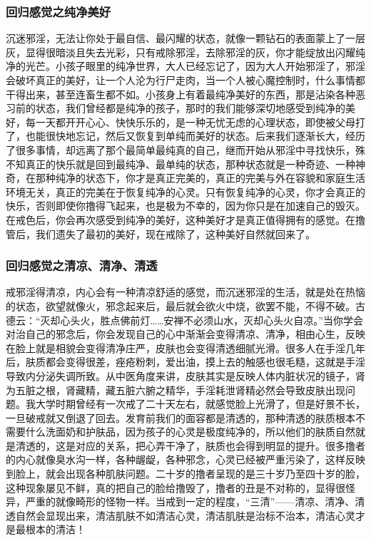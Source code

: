 \subsubsection{回归感觉之纯净美好}

沉迷邪淫，无法让你处于最自信、最闪耀的状态，就像一颗钻石的表面蒙上了一层灰，显得很暗淡且失去光彩，只有戒除邪淫，去除邪淫的灰，你才能绽放出闪耀纯净的光芒。小孩子眼里的纯净世界，大人已经忘记了，因为大人开始邪淫了，邪淫会破坏真正的美好，让一个人沦为行尸走肉，当一个人被心魔控制时，什么事情都干得出来，甚至连畜生都不如。小孩身上有着最纯净美好的东西，那是沾染各种恶习前的状态，我们曾经都是纯净的孩子，那时的我们能够深切地感受到纯净的美好，每一天都开开心心、快快乐乐的，是一种无忧无虑的心理状态，即使被父母打了，也能很快地忘记，然后又恢复到单纯而美好的状态。后来我们逐渐长大，经历了很多事情，却远离了那个最简单最纯真的自己，继而开始从邪淫中寻找快乐，殊不知真正的快乐就是回到最纯净、最单纯的状态，那种状态就是一种奇迹、一种神奇，在那种纯净的状态下，你才是真正完美的，真正的完美与外在容貌和家庭生活环境无关，真正的完美在于恢复纯净的心灵。只有恢复纯净的心灵，你才会真正的快乐，否则即使你撸得飞起来，也是极为不幸的，因为你只是在加速自己的毁灭。在戒色后，你会再次感受到纯净的美好，这种美好才是真正值得拥有的感觉。在撸管后，我们遗失了最初的美好，现在戒除了，这种美好自然就回来了。

\subsubsection{回归感觉之清凉、清净、清透}

戒邪淫得清凉，内心会有一种清凉舒适的感觉，而沉迷邪淫的生活，就是处在热恼的状态，欲望就像火，邪念起来后，最后就会欲火中烧，欲罢不能，不得不破。古德云：“灭却心头火，胜点佛前灯……安禅不必须山水，灭却心头火自凉。”当你学会对治自己的邪念后，你会发现自己的心中渐渐会变得清凉、清净，相由心生，反映在脸上就是相貌会变得清净庄严，皮肤也会变得清透细腻光滑。很多人在手淫几年后，肤质都会变得很差，痤疮粉刺，爱出油，摸上去的触感也很毛糙，这就是手淫导致内分泌失调所致。从中医角度来讲，皮肤其实是反映人体内脏状况的镜子，肾为五脏之根，肾藏精，藏五脏六腑之精华，手淫耗泄肾精必然会导致皮肤出现问题。我大学时期曾经有一次戒了二十天左右，就感觉脸上光滑了，但是好景不长，一旦破戒就又倒退了回去。发育前我们的面容都是清透的，那种清透的肤质根本不需要什么洗面奶和护肤品，因为孩子的心灵是极度纯净的，所以他们的肤质自然就是清透的，这是对应的关系，把心弄干净了，肤质也会得到明显的提升。很多撸者的内心就像臭水沟一样，各种龌龊，各种邪念，心灵已经被严重污染了，这样反映到脸上，就会出现各种肌肤问题。二十岁的撸者呈现的是三十岁乃至四十岁的脸，这种现象屡见不鲜，真的把自己的脸给撸毁了，撸者的丑是不对称的，显得很怪异，严重的就像畸形的怪物一样。当戒到一定的程度，“三清”——清凉、清净、清透自然会显现出来，清洁肌肤不如清洁心灵，清洁肌肤是治标不治本，清洁心灵才是最根本的清洁！


